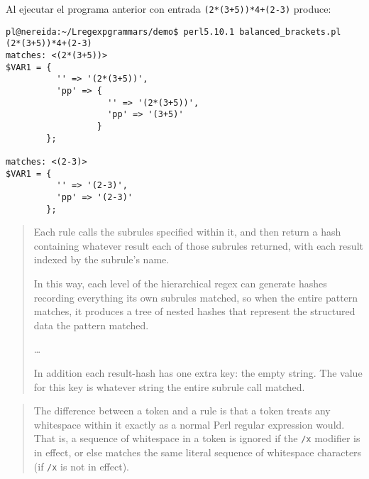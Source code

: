 Al ejecutar el programa anterior con entrada \verb|(2*(3+5))*4+(2-3)| produce:
\begin{verbatim}
pl@nereida:~/Lregexpgrammars/demo$ perl5.10.1 balanced_brackets.pl
(2*(3+5))*4+(2-3)
matches: <(2*(3+5))>
$VAR1 = {
          '' => '(2*(3+5))',
          'pp' => {
                    '' => '(2*(3+5))',
                    'pp' => '(3+5)'
                  }
        };

matches: <(2-3)>
$VAR1 = {
          '' => '(2-3)',
          'pp' => '(2-3)'
        };
\end{verbatim}


\begin{it}\begin{quotation}
Each rule calls the
subrules specified within it, and then return a hash containing whatever
result each of those subrules returned, with each result indexed by the
subrule’s name.

In this way, each level of the hierarchical regex can generate hashes
recording everything its own subrules matched, so when the entire pattern
matches, it produces a tree of nested hashes that represent the structured
data the pattern matched.

\ldots

In addition each result-hash has one extra key: the empty string. The
value for this key is whatever string the entire subrule call matched.
\end{quotation}\end{it}


\begin{it}\begin{quotation}
The difference between a token and a rule is that a token treats any
whitespace within it exactly as a normal Perl regular expression would.
That is, a sequence of whitespace in a token is ignored if the \verb"/x"
modifier is in effect, or else matches the same literal sequence of
whitespace characters (if \verb"/x" is not in effect).

\end{quotation}\end{it}

